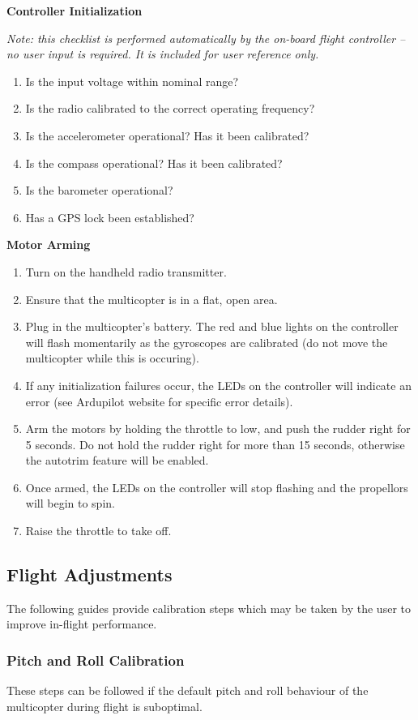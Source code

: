 \documentclass[10pt,letterpaper]{article}
\begin{document}
\textbf{Controller Initialization}

\textit{Note: this checklist is performed automatically by the on-board flight controller -- no user input is required. It is included for user reference only.}
\begin{enumerate}
\item Is the input voltage within nominal range?
\item Is the radio calibrated to the correct operating frequency?
\item Is the accelerometer operational? Has it been calibrated?
\item Is the compass operational? Has it been calibrated?
\item Is the barometer operational?
\item Has a GPS lock been established?
\end{enumerate}

\textbf{Motor Arming}
\begin{enumerate}
    \item Turn on the handheld radio transmitter.
    \item Ensure that the multicopter is in a flat, open area.
    \item Plug in the multicopter's battery. The red and blue lights on the controller will flash momentarily as the gyroscopes are calibrated (do not move the multicopter while this is occuring).
    \item If any initialization failures occur, the LEDs on the controller will indicate an error (see Ardupilot website for specific error details).
    \item Arm the motors by holding the throttle to low, and push the rudder right for 5 seconds. Do not hold the rudder right for more than 15 seconds, otherwise the autotrim feature will be enabled.
    \item Once armed, the LEDs on the controller will stop flashing and the propellors will begin to spin.
    \item Raise the throttle to take off.
\end{enumerate}

\subsection{Flight Adjustments}
The following guides provide calibration steps which may be taken by the user to improve in-flight performance.

\subsubsection{Pitch and Roll Calibration}
These steps can be followed if the default pitch and roll behaviour of the multicopter during flight is suboptimal.
\end{document}
